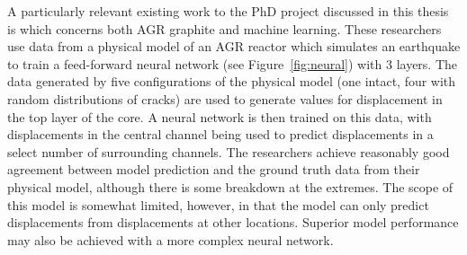 \noindent
A particularly relevant existing work to the PhD project discussed in this thesis is \cite{dihoru2018neural} which concerns both AGR graphite and machine learning. These researchers use data from a physical model of an AGR reactor which simulates an earthquake to train a feed-forward neural network (see Figure~\ref{fig:neural}) with 3 layers. The data generated by five configurations of the physical model (one intact, four with random distributions of cracks) are used to generate values for displacement in the top layer of the core. A neural network is then trained on this data, with displacements in the central channel being used to predict displacements in a select number of surrounding channels. The researchers achieve reasonably good agreement between model prediction and the ground truth data from their physical model, although there is some breakdown at the extremes. The scope of this model is somewhat limited, however, in that the model can only predict displacements from displacements at other locations. Superior model performance may also be achieved with a more complex neural network.  
